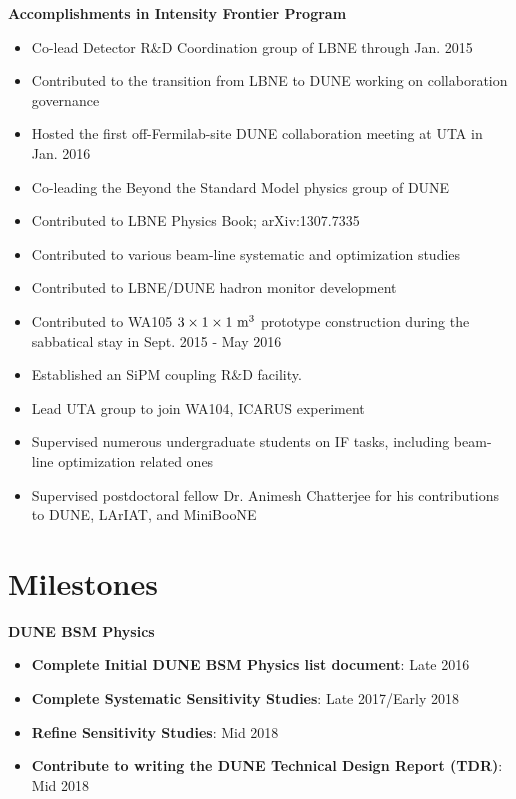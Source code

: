 \noindent\textbf{Accomplishments in Intensity Frontier Program}
\begin{itemize}[noitemsep,nolistsep]
\item{Co-lead Detector R$\&$D Coordination group of LBNE through Jan. 2015}
\item{Contributed to the transition from LBNE to DUNE working on collaboration governance}
\item{Hosted the first off-Fermilab-site DUNE collaboration meeting at UTA in Jan. 2016}
\item{Co-leading the Beyond the Standard Model physics group of DUNE}
\item{Contributed to LBNE Physics Book; arXiv:1307.7335}
\item{Contributed to various beam-line systematic and optimization studies}
\item{Contributed to LBNE/DUNE hadron monitor development}
\item{Contributed to WA105 $3\times 1 \times 1~{\rm m^{3}}$ prototype construction during the sabbatical stay in Sept. 2015 - May 2016}
\item{Established an SiPM coupling R$\&$D facility.}
\item{Lead UTA group to join WA104, ICARUS experiment}
\item {Supervised numerous undergraduate students on IF tasks, including beam-line optimization related ones}
\item {Supervised postdoctoral fellow Dr. Animesh Chatterjee for his contributions to DUNE, LArIAT, and MiniBooNE}
\end{itemize}

\section*{\textbf{Milestones}}
\noindent\textbf{DUNE BSM Physics}
\begin{itemize}[noitemsep,nolistsep]
\item{\textbf{Complete Initial DUNE BSM Physics list document}}: Late 2016
\item{\textbf{Complete Systematic Sensitivity Studies}}: Late 2017/Early 2018
\item{\textbf{Refine Sensitivity Studies}}: Mid 2018
\item{\textbf{Contribute to writing the DUNE Technical Design Report (TDR)}}: Mid 2018
\end{itemize}


